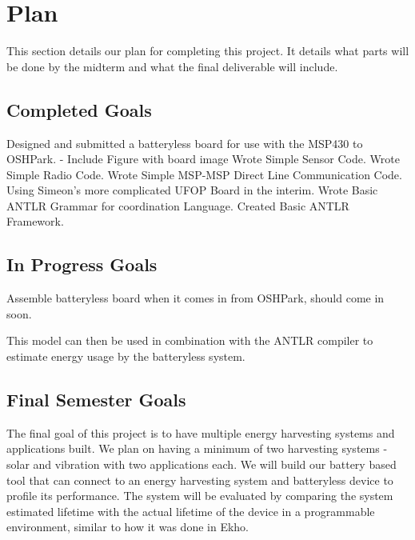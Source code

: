 \section{Plan} %
\label{sec:plan}

This section details our plan for completing this project. It details what parts will be done by the midterm and what the final deliverable will include.

\subsection{Completed Goals}

Designed and submitted a batteryless board for use with the MSP430 to OSHPark.
  - Include Figure with board image
Wrote Simple Sensor Code.
Wrote Simple Radio Code.
Wrote Simple MSP-MSP Direct Line Communication Code.
Using Simeon's more complicated UFOP Board in the interim.
Wrote Basic ANTLR Grammar for coordination Language.
Created Basic ANTLR Framework.


\subsection{In Progress Goals}

Assemble batteryless board when it comes in from OSHPark, should come in soon.

This model can then be used in combination with the ANTLR compiler to estimate energy usage by the batteryless system.

\subsection{Final Semester Goals}
The final goal of this project is to have multiple energy harvesting systems and applications built.
We plan on having a minimum of two harvesting systems - solar and vibration with two applications each.
We will build our battery based tool that can connect to an energy harvesting system and batteryless device to profile its performance.
The system will be evaluated by comparing the system estimated lifetime with the actual lifetime of the device in a programmable environment, similar to how it was done in Ekho.
